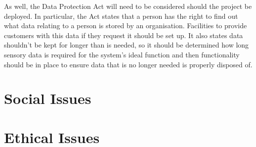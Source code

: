 \documentclass[]{report}
\begin{document}
As well, the Data Protection Act\cite{dataprotectionact2018} will need to be considered should the project be deployed. In particular, the Act states that a person has the right to find out what data relating to a person is stored by an organisation. Facilities to provide customers with this data if they request it should be set up. It also states data shouldn't be kept for longer than is needed, so it should be determined how long sensory data is required for the system's ideal function and then functionality should be in place to ensure data that is no longer needed is properly disposed of. 


\section{Social Issues}


\section{Ethical Issues}

	
	
	\newpage
	\begin{appendices}
		
		
		
	\end{appendices}
\end{document}
